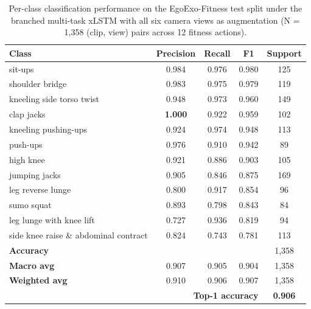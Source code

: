 \documentclass[conference,onecolumn,oneside]{IEEEtran}
\begin{document}
\begin{table}[H]
\centering
\caption{Per-class classification performance on the EgoExo-Fitness test split
under the branched multi-task xLSTM with all six camera views as augmentation
(N = 1{,}358 (clip, view) pairs across 12 fitness actions).}
\label{tab:multitask_cls}
\small
\renewcommand{\arraystretch}{1.10}
\begin{tabular}{|l|c|c|c|c|}
\hline
\textbf{Class} & \textbf{Precision} & \textbf{Recall} & \textbf{F1} & \textbf{Support} \\
\hline
sit-ups                                & 0.984 & 0.976 & 0.980 & 125 \\
shoulder bridge                        & 0.983 & 0.975 & 0.979 & 119 \\
kneeling side torso twist              & 0.948 & 0.973 & 0.960 & 149 \\
clap jacks                             & \textbf{1.000} & 0.922 & 0.959 & 102 \\
kneeling pushing-ups                   & 0.924 & 0.974 & 0.948 & 113 \\
push-ups                               & 0.976 & 0.910 & 0.942 & 89  \\
high knee                              & 0.921 & 0.886 & 0.903 & 105 \\
jumping jacks                          & 0.905 & 0.846 & 0.875 & 169 \\
leg reverse lunge                      & 0.800 & 0.917 & 0.854 & 96  \\
sumo squat                             & 0.893 & 0.798 & 0.843 & 84  \\
leg lunge with knee lift               & 0.727 & 0.936 & 0.819 & 94  \\
side knee raise \& abdominal contract  & 0.824 & 0.743 & 0.781 & 113 \\
\hline
\textbf{Accuracy}                      & \multicolumn{3}{c|}{} & 1{,}358 \\
\textbf{Macro avg}                     & 0.907 & 0.905 & 0.904 & 1{,}358 \\
\textbf{Weighted avg}                  & 0.910 & 0.906 & 0.907 & 1{,}358 \\
\hline
\multicolumn{4}{|r|}{\textbf{Top-1 accuracy}} & \textbf{0.906} \\
\hline
\end{tabular}
\end{table}
\end{document}
